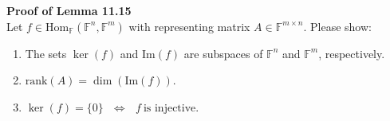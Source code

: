 \textbf{Proof of Lemma 11.15}\\
Let $f \in \text{Hom}_\mathbb{F}(\mathbb{F}^n,\mathbb{F}^m)$ with representing matrix $A \in \mathbb{F}^{m\times n}$. Please show:
\begin{enumerate}
	\item The sets $\ker (f)$ and $\text{Im} (f)$ are subspaces of $\mathbb{F}^n$ and $\mathbb{F}^m$, respectively.
	\item $\text{rank}(A) = \dim(\text{Im}(f))$.
	\item	$
	\ker (f) = \lbrace 0 \rbrace   ~~~\Leftrightarrow~~~ f ~\text{is injective}.
	$
\end{enumerate}